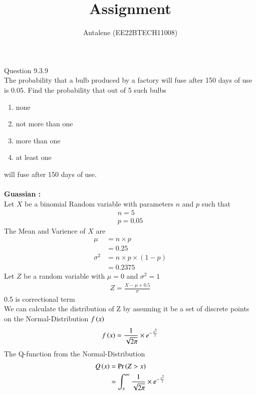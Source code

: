 \documentclass[article]{IEEEtran}
\theoremstyle{remark}
\begin{document}
\let\vec\mathbf


\title{
Assignment
}
\author{ Antalene (EE22BTECH11008)}
\maketitle

\vspace{3cm}
Question 9.3.9\\
The probability that a bulb produced by a factory will fuse after 150 days of use
is $0.05$. Find the probability that out of 5 such bulbs
\begin{enumerate}
\item  none
\item not more than one
\item more than one
\item at least one
\end{enumerate}
will fuse after 150 days of use.
\\
\solution\\
\textbf{Guassian :}\\
Let $X$ be a binomial Random variable with parameters $n$ and $p$ such that
\begin{align}
	n = 5\\
	p = 0.05
\end{align}
The Mean and Varience of $X$ are
\begin{align}
	\mu &= n \times p\\
	&= 0.25\\
	\sigma^2 &= n\times p \times (1-p)\\
	&= 0.2375
\end{align}
Let $Z$ be a random variable with $\mu = 0$ and $\sigma^2 = 1$
\begin{align}
	Z = \frac{X - \mu + 0.5}{\sigma}
\end{align}
0.5 is correctional term\\
We can calculate the distribution of Z by assuming it be a set of discrete points on the
Normal-Distribution $f\left(x\right)$
\begin{align}
	f\left(x\right) = \frac{1}{\sqrt{2\pi}} \times e^{-\frac{x^2}{2}}\\
\end{align}
The Q-function from the Normal-Distribution
\begin{align}
	Q\left(x\right) &= \Pr\left(Z>x\right)\\
	&= \int_{x}^{\infty} \frac{1}{\sqrt{2\pi}} \times e^{-\frac{x^2}{2}}
\end{align}
\end{document}
